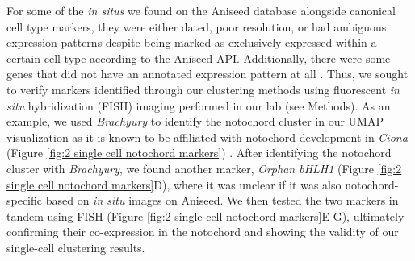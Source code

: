 For some of the \textit{in situs} we found on the Aniseed database alongside canonical cell type markers, they were either dated, poor resolution, or had ambiguous expression patterns despite being marked as exclusively expressed within a certain cell type according to the Aniseed API. Additionally, there were some genes that did not have an annotated expression pattern at all \cite{dardaillon2020}. Thus, we sought to verify markers identified through our clustering methods using fluorescent \textit{in situ} hybridization (FISH) imaging performed in our lab (see Methods). As an example, we used \textit{Brachyury} to identify the notochord cluster in our UMAP visualization as it is known to be affiliated with notochord development in \textit{Ciona} (Figure \ref{fig:2 single cell notochord markers}) \cite{chesley1935,wilkinson1990,yasuo1993,reeves2021,casey1998,conlon2001,barnett1998,corbo1997,chiba2009,jose-edwards2015a,lolas2014,katikala2013,schulte-merker1995,muller1997,matsumoto2007a,passamaneck2009a}. After identifying the notochord cluster with \textit{Brachyury}, we found another marker, \textit{Orphan bHLH1} (Figure \ref{fig:2 single cell notochord markers}D), where it was unclear if it was also notochord-specific based on \textit{in situ} images on Aniseed. We then tested the two markers in tandem using FISH (Figure \ref{fig:2 single cell notochord markers}E-G), ultimately confirming their co-expression in the notochord and showing the validity of our single-cell clustering results. 


